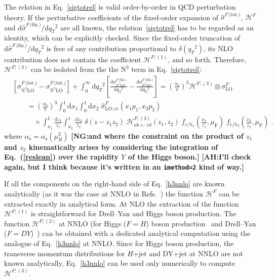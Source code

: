 \documentclass[12pt]{article}
\DeclareRobustCommand{\nn}{\nonumber}
\DeclareRobustCommand{\AH}[1]{\textbf{\quad\color{purple}[AH:\quad #1]}\xspace}
\DeclareRobustCommand{\NG}[1]{\textbf{\quad\color{blue}[NG:\quad #1]}\xspace}
\DeclareRobustCommand{\alphas}{\ensuremath{\alpha_{\mathrm{s}}}\xspace}
\DeclareRobustCommand{\as}{\alphas}
\DeclareRobustCommand{\asOpi}{\ensuremath{\left(\frac{\as}{\pi}\right)}} %
\DeclareRobustCommand{\muf}{\ensuremath{\mu_{\mathrm{F}}}\xspace}
\DeclareRobustCommand{\qt}{\ensuremath{q_T}\xspace}
\DeclareRobustCommand{\rd}{\ensuremath{\mathrm{d}}}
\DeclareRobustCommand{\cH}{\ensuremath{\mathcal{H}}}
\DeclareRobustCommand{\fin}{\text{(fin.)}\xspace}
\DeclareRobustCommand{\tot}{\text{(tot.)}\xspace}
\DeclareRobustCommand{\LO}{\text{LO}\xspace}
\DeclareRobustCommand{\N}[1]{\ensuremath{\text{N}^{#1}}} %
\begin{document}
The relation in Eq.~\eqref{sigtotrel} is valid order-by-order in QCD perturbation theory. If the perturbative coefficients of the fixed-order expansion of $\hat{\sigma}^{F\,\tot}$, $\cH^F$ and $\rd\hat{\sigma}^{F\,\fin}/\rd \qt^2$ are all known, the relation~\eqref{sigtotrel} has to be regarded as an identity, which can be explicitly checked. Since the fixed-order truncation of $\rd\hat{\sigma}^{F\,\fin}/\rd \qt^2$ is free of any contribution proportional to $\delta(\qt^2)$, its NLO contribution  does not contain the coefficient $\cH^{F;(1)}$, and so forth. 
Therefore, $\cH^{F;(3)}$ can be isolated from the  the  \N3\LO  term in Eq.~\eqref{sigtotrel}:
\begin{align}
  &
  \left[
    \sigma^{F\,\tot}_{\N3\LO} - 
    \sigma^{F\,\tot}_{\N2\LO}
  \right] +
  \int_0^\infty\rd\qt^2 \left[
    \frac{\rd\sigma^{F\,\fin}_{\N3\LO}}{\rd\qt^2} -
    \frac{\rd\sigma^{F\,\fin}_{\N2\LO}}{\rd\qt^2}
  \right]
  =
  \asOpi^3 \cH^{F;(3)} \otimes \sigma^F_{\LO}
  \nn\\&\qquad=
  \asOpi^3 \int_0^1\rd x_1 \int_0^1\rd x_2 \;
  \hat{\sigma}^{F}_{\LO;c\bar{c}}(x_1 p_1, x_2 p_2)
  \nn\\&\qquad\quad\times
  \int_{x_1}^1 \frac{\rd z_1}{z_1} \int_{x_2}^1 \frac{\rd z_2}{z_2} \;
  \delta(z-z_1z_2) \;
  \cH^{F;(3)}_{ab \gets cd}(z_1, z_2) \;
  f_{c/h_1}\left(\frac{x_1}{z_1},\muf\right) \; f_{\bar{c}/h_2}\left(\frac{x_2}{z_2},\muf\right) \;.
  \label{h3nnlo}
\end{align}
where $\as=\as(\mu_R^2)$ 
\NG{and where the constraint on the product of $z_1$ and $z_2$ kinematically arises by considering the integration of Eq.~(\ref{reslean}) over the rapidity $Y$ of the Higgs boson.}
\AH{I'll check again, but I think because it's written in an \texttt{imethod=2} kind of way.}


If all the components on the right-hand side of Eq.~\eqref{h3nnlo} are known analytically (as it was the case at NNLO in Refs.~\cite{Catani:2011kr,Catani:2012qa}) the function $\cH^{F}$ can be extracted exactly in analytical form. At NLO the extraction of the function  $\cH^{F;(1)}$ is straightforward for Drell--Yan and Higgs boson production. The function $\cH^{F;(2)}$ at NNLO (for Higgs ($F=H$) boson production~\cite{Catani:2011kr} and Drell--Yan ($F=DY$)~\cite{Catani:2012qa}) can be obtained with a dedicated analytical computation using the analogue of Eq.~\eqref{h3nnlo} at NNLO. Since for Higgs boson production, the transverse momentum distributions for $H$+jet and DY+jet at NNLO are not known analytically, Eq.~\eqref{h3nnlo} can be used only numerically to compute $\cH^{F;(3)}$. 
\end{document}
